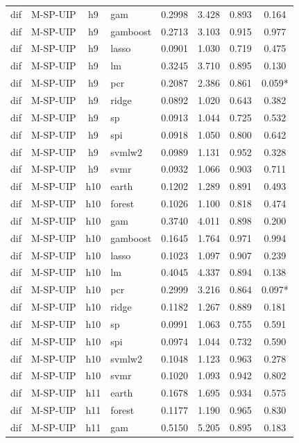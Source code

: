 \begin{ThreePartTable}
\begin{longtable}[t]{llclcccc}
dif & M-SP-UIP & h9 & gam & 0.2998 & 3.428 & 0.893 & 0.164\\
dif & M-SP-UIP & h9 & gamboost & 0.2713 & 3.103 & 0.915 & 0.977\\
dif & M-SP-UIP & h9 & lasso & 0.0901 & 1.030 & 0.719 & 0.475\\
dif & M-SP-UIP & h9 & lm & 0.3245 & 3.710 & 0.895 & 0.130\\
dif & M-SP-UIP & h9 & pcr & 0.2087 & 2.386 & 0.861 & 0.059*\\
dif & M-SP-UIP & h9 & ridge & 0.0892 & 1.020 & 0.643 & 0.382\\
dif & M-SP-UIP & h9 & sp & 0.0913 & 1.044 & 0.725 & 0.532\\
dif & M-SP-UIP & h9 & spi & 0.0918 & 1.050 & 0.800 & 0.642\\
dif & M-SP-UIP & h9 & svmlw2 & 0.0989 & 1.131 & 0.952 & 0.328\\
dif & M-SP-UIP & h9 & svmr & 0.0932 & 1.066 & 0.903 & 0.711\\
\addlinespace
dif & M-SP-UIP & h10 & earth & 0.1202 & 1.289 & 0.891 & 0.493\\
dif & M-SP-UIP & h10 & forest & 0.1026 & 1.100 & 0.818 & 0.474\\
dif & M-SP-UIP & h10 & gam & 0.3740 & 4.011 & 0.898 & 0.200\\
dif & M-SP-UIP & h10 & gamboost & 0.1645 & 1.764 & 0.971 & 0.994\\
dif & M-SP-UIP & h10 & lasso & 0.1023 & 1.097 & 0.907 & 0.239\\
dif & M-SP-UIP & h10 & lm & 0.4045 & 4.337 & 0.894 & 0.138\\
dif & M-SP-UIP & h10 & pcr & 0.2999 & 3.216 & 0.864 & 0.097*\\
dif & M-SP-UIP & h10 & ridge & 0.1182 & 1.267 & 0.889 & 0.181\\
dif & M-SP-UIP & h10 & sp & 0.0991 & 1.063 & 0.755 & 0.591\\
dif & M-SP-UIP & h10 & spi & 0.0974 & 1.044 & 0.732 & 0.590\\
dif & M-SP-UIP & h10 & svmlw2 & 0.1048 & 1.123 & 0.963 & 0.278\\
dif & M-SP-UIP & h10 & svmr & 0.1020 & 1.093 & 0.942 & 0.802\\
\addlinespace
dif & M-SP-UIP & h11 & earth & 0.1678 & 1.695 & 0.934 & 0.575\\
dif & M-SP-UIP & h11 & forest & 0.1177 & 1.190 & 0.965 & 0.830\\
dif & M-SP-UIP & h11 & gam & 0.5150 & 5.205 & 0.895 & 0.183\\

\end{longtable}
\end{ThreePartTable}
